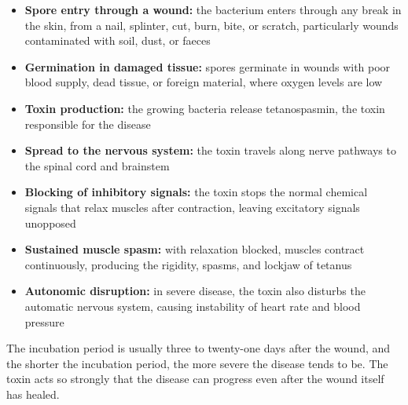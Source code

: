 \begin{itemize}
    \item \textbf{Spore entry through a wound:} the bacterium enters through any break in the skin, from a nail, splinter, cut, burn, bite, or scratch, particularly wounds contaminated with soil, dust, or faeces
    \item \textbf{Germination in damaged tissue:} spores germinate in wounds with poor blood supply, dead tissue, or foreign material, where oxygen levels are low
    \item \textbf{Toxin production:} the growing bacteria release tetanospasmin, the toxin responsible for the disease
    \item \textbf{Spread to the nervous system:} the toxin travels along nerve pathways to the spinal cord and brainstem
    \item \textbf{Blocking of inhibitory signals:} the toxin stops the normal chemical signals that relax muscles after contraction, leaving excitatory signals unopposed
    \item \textbf{Sustained muscle spasm:} with relaxation blocked, muscles contract continuously, producing the rigidity, spasms, and lockjaw of tetanus
    \item \textbf{Autonomic disruption:} in severe disease, the toxin also disturbs the automatic nervous system, causing instability of heart rate and blood pressure
\end{itemize}

The incubation period is usually three to twenty-one days after the wound, and the shorter the incubation period, the more severe the disease tends to be. The toxin acts so strongly that the disease can progress even after the wound itself has healed.

